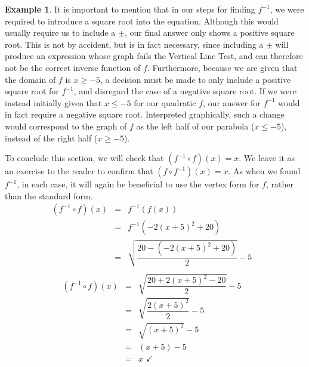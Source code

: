 \documentclass[12pt]{book}
\theoremstyle{definition}
\newtheorem{example}{Example}
\begin{document}
\begin{example}
It is important to mention that in our steps for finding $f^{-1}$, we were required to introduce a square root into the equation.  Although this would usually require us to include a $\pm$, our final answer only shows a positive square root.  This is not by accident, but is in fact necessary, since including a $\pm$ will produce an expression whose graph fails the Vertical Line Test, and can therefore not be the correct inverse function of $f$.  Furthermore, because we are given that the domain of $f$ is $x\geq -5$, a decision must be made to only include a positive square root for $f^{-1}$, and disregard the case of a negative square root.  If we were instead initially given that $x\leq -5$ for our quadratic $f$, our answer for $f^{-1}$ would in fact require a negative square root.  Interpreted graphically, such a change would correspond to the graph of $f$ as the left half of our parabola ($x\leq -5$), instead of the right half ($x\geq -5$).\par
To conclude this section, we will check that $(f^{-1}\circ f)(x)=x$.  We leave it as an exercise to the reader to confirm that $(f\circ f^{-1})(x)=x$.  As when we found $f^{-1}$, in each case, it will again be beneficial to use the vertex form for $f$, rather than the standard form.
\[ \begin{array}{rclr}
\left(f^{-1}\circ f \right)(x) & = & f^{-1}\left(f(x)\right) & \\ [15pt]
 & = & f^{-1} \left(-2(x+5)^2+20\right) & \\ [15pt]
& = &  \sqrt{\dfrac{20-(-2(x+5)^2+20)}{2}}-5 \\ [30pt]
\end{array} \]
\[ \begin{array}{rclr}
\left(f^{-1}\circ f \right)(x) & = &  \sqrt{\dfrac{20+2(x+5)^2-20}{2}}-5  \\ [30pt]
& = &  \sqrt{\dfrac{2(x+5)^2}{2}}-5 & \\ [15pt]
& = &  \sqrt{(x+5)^2}-5 & \\ [15pt]
& = &  (x+5)-5 & \\ [15pt]
& = & x \, \, \checkmark 
\end{array} \]
\end{example}
\end{document}
